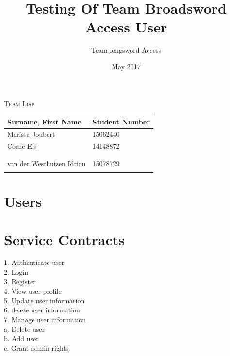 \documentclass[english]{article}
\begin{document}
\title{Testing Of Team Broadsword Access User }
\author{Team longsword Access }
\date{May 2017}
\maketitle
\begin{center}
{\scshape\Large Team Lisp \par}
\vspace{0.9cm}
	\begin{tabu} to \textwidth { X[l] X[l]}
		\hline
		\textbf{Surname, First Name  }	& \textbf{Student Number}	\\ \hline \hline
		   Merissa Joubert &15062440	\\ \hline
		  Corne Els &14148872	\\ \hline
		  &	\\ \hline
	    	 &	\\ \hline
		van der Westhuizen Idrian&15078729\\ \hline
		 &	\\ \hline
		\hline
	\end{tabu}

	\end{center}

	\newpage
	\tableofcontents

	\newpage

\section{Users}

\section{Service Contracts}
1.	Authenticate user\\
2.	Login\\
3.	Register\\
4.	View user profile\\
5.	Update user information\\
6.	delete user information\\
7.	Manage user information\\
    a.	Delete user\\
    b.	Add user\\
    c.	Grant admin rights\\
\end{document}
